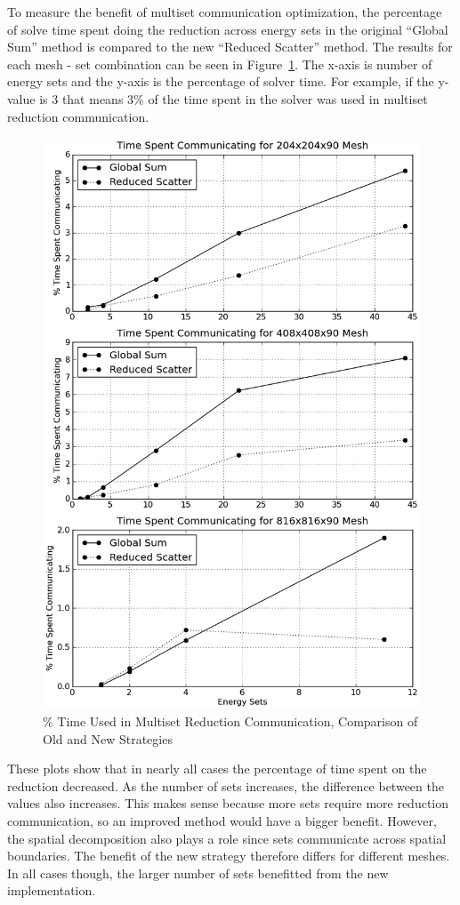 To measure the benefit of multiset communication optimization, the percentage of solve time spent doing the reduction across energy sets in the original ``Global Sum'' method is compared to the new ``Reduced Scatter'' method. The results for each mesh - set combination can be seen in Figure~\ref{fig:MultisetCommOpt}. The x-axis is number of energy sets and the y-axis is the percentage of solver time. For example, if the y-value is 3 that means 3\% of the time spent in the solver was used in multiset reduction communication. 
%
\begin{figure}[!h]
  \begin{center}
    \includegraphics [width=.7\textwidth, height=0.85\textheight ] {MultisetCommOpt}
  \end{center}
  \caption{\% Time Used in Multiset Reduction Communication, Comparison of Old and New Strategies}
  \label{fig:MultisetCommOpt}
\end{figure}

These plots show that in nearly all cases the percentage of time spent on the reduction decreased. As the number of sets increases, the difference between the values also increases. This makes sense because more sets require more reduction communication, so an improved method would have a bigger benefit. However, the spatial decomposition also plays a role since sets communicate across spatial boundaries. The benefit of the new strategy therefore differs for different meshes. In all cases though, the larger number of sets benefitted from the new implementation. 

